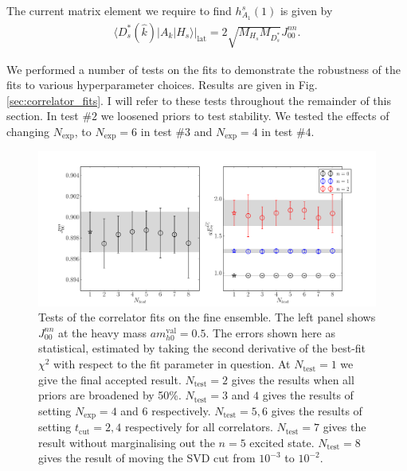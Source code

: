 The current matrix element we require to find $h_{A_1}^s(1)$ is given by
\begin{align}
  \langle D_s^*(\hat{k}) | A_k | H_s \rangle |_{\text{lat}} = 2 \sqrt{M_{H_s}M_{D_s^*}} J^{nn}_{00}.
  \label{eq:currentfit}
\end{align}

We performed a number of tests on the fits to demonstrate the robustness of the fits to various hyperparameter choices. Results are given in Fig. \ref{sec:correlator_fits}. I will refer to these tests throughout the remainder of this section. In test $\#2$ we loosened priors to test stability. We tested the effects of changing $N_{\text{exp}}$, to $N_{\text{exp}}=6$ in test $\#3$ and $N_{\text{exp}}=4$ in test $\#4$.

\begin{figure}[htb!]
  \begin{center}
  \includegraphics[width=1.1\textwidth]{images/BsDsstar/fittests_fine.pdf}
  \caption{Tests of the correlator fits on the fine ensemble. The left panel shows $J_{00}^{nn}$ at the heavy mass $am_{h0}^{\text{val}}=0.5$. The errors shown here as statistical, estimated by taking the second derivative of the best-fit $\chi^2$ with respect to the fit parameter in question. At $N_{\text{test}}=1$ we give the final accepted result. $N_{\text{test}}=2$ gives the results when all priors are broadened by 50\%. $N_{\text{test}}=3$ and $4$ gives the results of setting $N_{\text{exp}}=4$ and $6$ respectively. $N_{\text{test}}=5,6$ gives the results of setting $t_{\text{cut}}=2,4$ respectively for all correlators. $N_{\text{test}}=7$ gives the result without marginalising out the $n=5$ excited state. $N_{\text{test}}=8$ gives the result of moving the SVD cut from $10^{-3}$ to $10^{-2}$. \label{fig:corr_fit_tests}}
  \end{center}
  \vspace{-10pt}
\end{figure}

